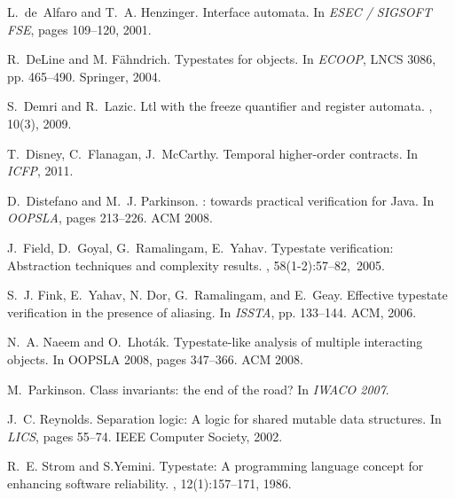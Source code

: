 \documentclass{sigplanconf}[10pt] %
\begin{document}
\begin{thebibliography}{10}
L.~de~Alfaro and T.~A. Henzinger.
\newblock Interface automata.
\newblock In {\em ESEC / SIGSOFT FSE}, pages 109--120, 2001.

R.~DeLine and M. F{\"a}hndrich.
\newblock Typestates for objects.
\newblock In {\em ECOOP}, LNCS 3086, pp. 465--490. Springer, 2004.

S.~Demri and R.~Lazic.
\newblock Ltl with the freeze quantifier and register automata.
, 10(3), 2009.

T.~Disney, C.~Flanagan, J.~McCarthy.
\newblock Temporal higher-order contracts.
\newblock In {\em ICFP}, 2011.

D.~Distefano and M.~J. Parkinson.
: towards practical verification for {Java}.
\newblock In {\em OOPSLA}, pages 213--226. ACM 2008.

J.~Field, D.~Goyal, G.~Ramalingam, E.~Yahav.
\newblock Typestate verification: Abstraction techniques and complexity
  results.
, 58(1-2):57--82,~2005.

S.~J. Fink, E.~Yahav, N. Dor, G.~Ramalingam, and E.~Geay.
\newblock Effective typestate verification in the presence of aliasing.
\newblock In  {\em ISSTA}, pp. 133--144. ACM, 2006.


N.~A. Naeem and O.~Lhot{\'a}k.
\newblock Typestate-like analysis of multiple interacting objects.
\newblock In OOPSLA 2008, pages 347--366. ACM 2008.

M.~Parkinson.
\newblock Class invariants: the end of the road?
\newblock In {\em IWACO 2007}.


J.~C. Reynolds.
\newblock Separation logic: A logic for shared mutable data structures.
\newblock In {\em LICS}, pages 55--74. IEEE Computer Society, 2002.

R.~E. Strom and S.Yemini.
\newblock Typestate: A programming language concept for enhancing software
  reliability.
, 12(1):157--171, 1986.

%
%
\end{thebibliography}
\end{document}
